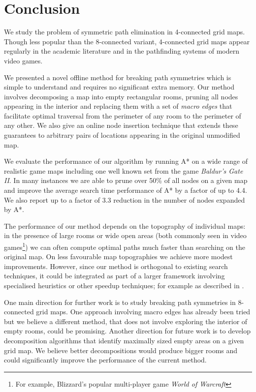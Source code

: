 \section{Conclusion}
We study the problem of symmetric path elimination in 4-connected grid maps.
Though less popular than the 8-connected variant, 4-connected grid maps appear 
regularly in the academic literature and in the pathfinding systems of modern
video games.
\par
We presented a novel offline method for breaking path symmetries which is simple
to understand and requires no significant extra memory. 
Our method involves decomposing a map into empty rectangular rooms, pruning all nodes
appearing in the interior and replacing them with a set of \emph{macro edges}
that facilitate optimal traversal from the perimeter of any room to the perimeter
of any other.
We also give an online node insertion technique that extends these guarantees
 to arbitrary pairs of locations appearing in the original unmodified map.
\par
We evaluate the performance of our algorithm by running A* on a wide
range of realistic game maps including one well known set from the game
\emph{Baldur's Gate II}. 
In many instances we are able to prune over 50\% of all nodes on a given map
and improve the average search time performance of A* by a factor of up to 4.4.
We also report up to a factor of 3.3 reduction in the number of nodes expanded
by A*.
\par
The performance of our method depends on the topography of individual maps: 
in the presence of large rooms or wide open areas (both commonly seen in video games\footnote{For 
example, Blizzard's popular multi-player game \emph{World of Warcraft}})
we can often compute optimal paths much faster than searching on the original map. 
On less favourable map topographies we achieve more modest improvements.
However, since our method is orthogonal to existing search techniques, it could be integrated
as part of a larger framework involving specialised heuristics or other speedup techniques; 
for example as described in \cite{botea04,bjornsson05,bjornsson06}. 
\par
One main direction for further work is to study breaking path symmetries
in 8-connected grid maps.
One approach involving macro edges has already been tried 
\cite{bolanca09} but we believe a different method, that does not involve
exploring the interior of empty rooms, could be promising.
Another direction for future work is to develop decomposition algorithms that identify maximally
sized empty areas on a given grid map.
We believe better decompositions would produce bigger rooms and could significantly improve 
the performance of the current method.
